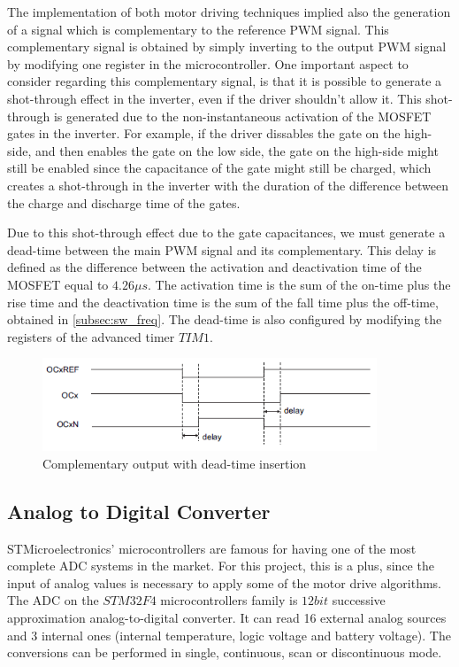 The implementation of both motor driving techniques implied also the generation of a signal which is complementary to the reference \ac{PWM} signal. This complementary signal is obtained by simply inverting to the output \ac{PWM} signal by modifying one register in the microcontroller. One important aspect to consider regarding this complementary signal, is that it is possible to generate a shot-through effect in the inverter, even if the driver shouldn't allow it. This shot-through is generated due to the non-instantaneous activation of the \ac{MOSFET} gates in the inverter. For example, if the driver dissables the gate on the high-side, and then enables the gate on the low side, the gate on the high-side might still be enabled since the capacitance of the gate might still be charged, which creates a shot-through in the inverter with the duration of the difference between the charge and discharge time of the gates.

Due to this shot-through effect due to the gate capacitances, we must generate a dead-time between the main \ac{PWM} signal and its complementary. This delay is defined as the difference between the activation and deactivation time of the \ac{MOSFET} equal to $4.26\mu s$. The activation time is the sum of the on-time plus the rise time and the deactivation time is the sum of the fall time plus the off-time, obtained in \ref{subsec:sw_freq}. The dead-time is also configured by modifying the registers of the advanced timer $TIM1$.

\begin{figure}[htbp]
\centering
\includegraphics[width=10cm]{Images/dead_time.png} 
\caption[Complementary output with dead-time insertion]{Complementary output with dead-time insertion}
\label{fig:dead_time}
\end{figure}

\subsection{Analog to Digital Converter}

STMicroelectronics' microcontrollers are famous for having one of the most complete \ac{ADC} systems in the market. For this project, this is a plus, since the input of analog values is necessary to apply some of the motor drive algorithms. The \ac{ADC} on the $STM32F4$ microcontrollers family is $12bit$ successive approximation analog-to-digital converter. It can read 16 external analog sources and 3 internal ones (internal temperature, logic voltage and battery voltage). The conversions can be performed in single, continuous, scan or discontinuous mode.

